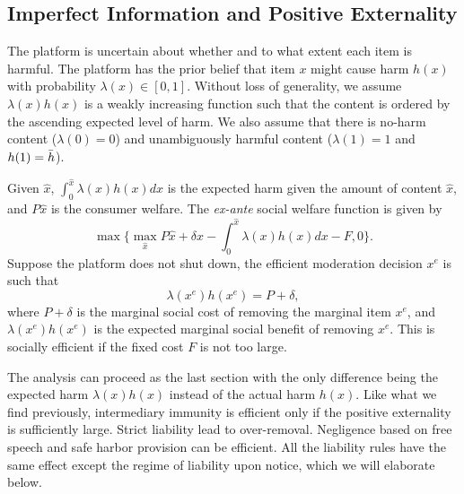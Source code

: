 \subsection{Imperfect Information and Positive Externality}

The platform is uncertain about whether and to what extent each item is harmful. 
The platform has the prior belief that item $x$ might cause harm $h(x)$ with probability $\lambda(x)\in[0,1]$. Without loss of generality, we assume $\lambda(x)h(x)$ is a weakly increasing function such that the content is ordered by the ascending expected level of harm. We also assume that there is no-harm content ($\lambda(0)=0$) and unambiguously harmful content ($\lambda(1)=1$ and $h(1)=\Bar{h}$).

Given $\hat{x}$, $\int_0^{\hat{x}}\lambda(x)h(x)dx$ is the expected harm given the amount of content $\hat{x}$, and $P\hat{x}$ is the consumer welfare.
The \emph{ex-ante} social welfare function is given by 
\begin{equation}
    \max\{\max_{\hat{x}}P\hat{x}+\delta\hat{x} - \int_0^{\hat{x}}\lambda(x)h(x)dx-F, 0\}.
\end{equation}
Suppose the platform does not shut down, 
the efficient moderation decision $x^e$ is such that
\begin{equation}
    \lambda(x^e)h(x^e)=P+\delta,
\end{equation}
where $P+\delta$ is the marginal social cost of removing the marginal item $x^e$, and $\lambda(x^e)h(x^e)$ is the expected marginal social benefit of removing $x^e$. This is socially efficient if the fixed cost $F$ is not too large.

The analysis can proceed as the last section with the only difference being the expected harm $\lambda(x)h(x)$ instead of the actual harm $h(x)$. Like what we find previously, intermediary immunity is efficient only if the positive externality is sufficiently large. Strict liability lead to over-removal. Negligence based on free speech and safe harbor provision can be efficient. All the liability rules have the same effect except the regime of liability upon notice, which we will elaborate below. 



